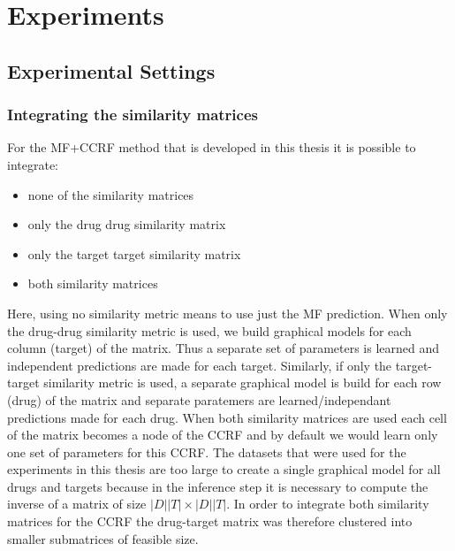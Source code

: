 \chapter{Experiments}



\section{Experimental Settings}

\subsection{Integrating the similarity matrices}
For the MF+CCRF method that is developed in this thesis it is possible to integrate:
\begin{itemize}
\item none of the similarity matrices
\item only the drug drug similarity matrix
\item only the target target similarity matrix
\item both similarity matrices
\end{itemize}
Here, using no similarity metric means to use just the MF prediction. When only the drug-drug similarity metric is used, we build graphical models for each column (target) of the matrix. Thus a separate set of parameters is learned and independent predictions are made for each target. Similarly, if only the target-target similarity metric is used, a separate graphical model is build for each row (drug) of the matrix and separate paratemers are learned/independant predictions made for each drug. When both similarity matrices are used each cell of the matrix becomes a node of the CCRF and by default we would learn only one set of parameters for this CCRF. The datasets that were used for the experiments in this thesis are too large to create a single graphical model for all drugs and targets because in the inference step it is necessary to compute the inverse of a matrix of size $|D||T| \times |D||T|$. In order to integrate both similarity matrices for the CCRF the drug-target matrix was therefore clustered into smaller submatrices of feasible size. 
